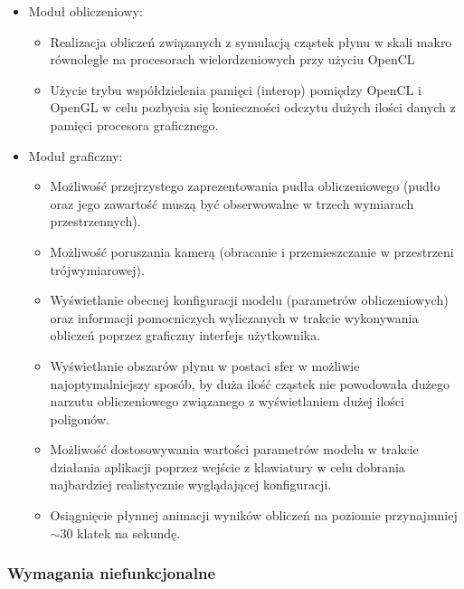 \documentclass[polish, 12pt]{aghthesis}
\begin{document}
		\begin{itemize}
		
			\item Moduł obliczeniowy:
			
			\begin{itemize}
			
				\item Realizacja obliczeń związanych z symulacją cząstek płynu w skali makro równolegle na procesorach wielordzeniowych przy użyciu OpenCL
				\item Użycie trybu współdzielenia pamięci (interop) pomiędzy OpenCL i OpenGL w celu pozbycia się konieczności odczytu dużych ilości danych z pamięci procesora graficznego.
			
			\end{itemize}						
			
			\item Moduł graficzny:
			
			\begin{itemize}
			
				\item Możliwość przejrzystego zaprezentowania pudła obliczeniowego (pudło oraz jego zawartość muszą być obserwowalne w trzech wymiarach przestrzennych).
				\item Możliwość poruszania kamerą (obracanie i przemieszczanie w przestrzeni trójwymiarowej).
				\item Wyświetlanie obecnej konfiguracji modelu (parametrów obliczeniowych) oraz informacji pomocniczych wyliczanych w trakcie wykonywania obliczeń poprzez graficzny interfejs użytkownika.
				\item Wyświetlanie obszarów płynu w postaci sfer w możliwie najoptymalniejszy sposób, by duża ilość cząstek nie powodowała dużego narzutu obliczeniowego związanego z wyświetlaniem dużej ilości poligonów.
				\item Możliwość dostosowywania wartości parametrów modelu w trakcie działania aplikacji poprzez wejście z klawiatury w celu dobrania najbardziej realistycznie wyglądającej konfiguracji.
				\item Osiągnięcie płynnej animacji wyników obliczeń na poziomie przynajmniej $\sim30$ klatek na sekundę.
			
			\end{itemize}	
		
		\end{itemize}
		
		\subsubsection{Wymagania niefunkcjonalne}
		
\end{document}
